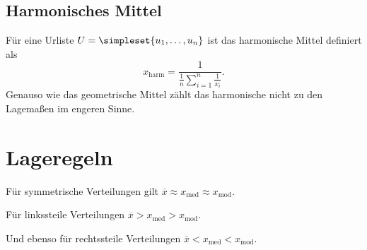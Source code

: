 \subsection{Harmonisches Mittel}
Für eine Urliste $U=\simpleset{u_1,\ldots,u_n}$ ist das harmonische Mittel definiert als
\begin{equation*}
	x_{\operatorname{harm}}=\frac{1}{\frac 1n\sum_{i=1}^n \frac 1{x_i}}.
\end{equation*}
Genauso wie das geometrische Mittel zählt das harmonische nicht zu den Lagemaßen im engeren Sinne.

\section{Lageregeln}
Für symmetrische Verteilungen gilt $\overline x\approx x_{\operatorname{med}}\approx x_{\operatorname{mod}}$.

Für linkssteile Verteilungen $\overline x> x_{\operatorname{med}}> x_{\operatorname{mod}}$.

Und ebenso für rechtssteile Verteilungen $\overline x< x_{\operatorname{med}}< x_{\operatorname{mod}}$.


